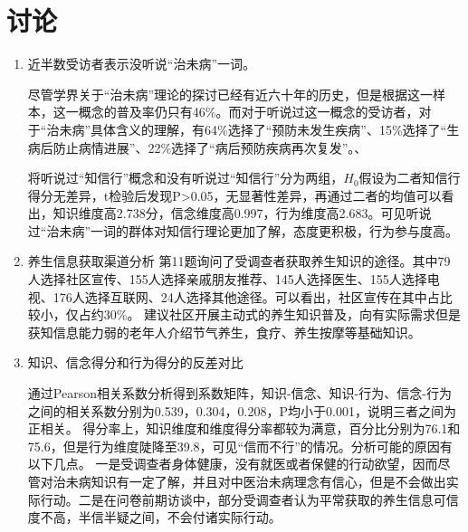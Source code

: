 \documentclass{article}
\begin{document}
\section{讨论}
\begin{enumerate}
    \item 近半数受访者表示没听说“治未病”一词。
    
    尽管学界关于“治未病”理论的探讨已经有近六十年的历史，但是根据这一样本，这一概念的普及率仍只有46\%。而对于听说过这一概念的受访者，对于“治未病”具体含义的理解，有64\%选择了“预防未发生疾病”、15\%选择了“生病后防止病情进展”、22\%选择了“病后预防疾病再次复发”。、
	
	将听说过“知信行”概念和没有听说过“知信行”分为两组，$H_0$假设为二者知信行得分无差异，t检验后发现P>0.05，无显著性差异，再通过二者的均值可以看出，知识维度高2.738分，信念维度高0.997，行为维度高2.683。可见听说过“治未病”一词的群体对知信行理论更加了解，态度更积极，行为参与度高。
	
    \item 养生信息获取渠道分析
    第11题询问了受调查者获取养生知识的途径。其中79人选择社区宣传、155人选择亲戚朋友推荐、145人选择医生、155人选择电视、176人选择互联网、24人选择其他途径。可以看出，社区宣传在其中占比较小，仅占约30\%。
	建议社区开展主动式的养生知识普及，向有实际需求但是获知信息能力弱的老年人介绍节气养生，食疗、养生按摩等基础知识。

	
	\item 知识、信念得分和行为得分的反差对比
	
	通过Pearson相关系数分析得到系数矩阵，知识-信念、知识-行为、信念-行为之间的相关系数分别为0.539，0.304，0.208，P均小于0.001，说明三者之间为正相关。
	得分率上，知识维度和维度得分率都较为满意，百分比分别为76.1和75.6，但是行为维度陡降至39.8，可见“信而不行”的情况。分析可能的原因有以下几点。
	一是受调查者身体健康，没有就医或者保健的行动欲望，因而尽管对治未病知识有一定了解，并且对中医治未病理念有信心，但是不会做出实际行动。二是在问卷前期访谈中，部分受调查者认为平常获取的养生信息可信度不高，半信半疑之间，不会付诸实际行动。
	
\end{enumerate}


\printbibliography
\appendix{}

\end{document}
